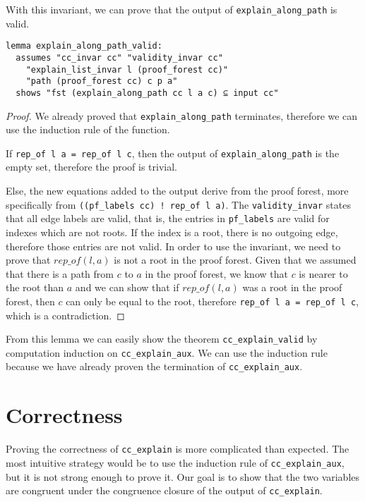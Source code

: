 With this invariant, we can prove that the output of \lstinline{explain_along_path} is valid.

\begin{lstlisting}
lemma explain_along_path_valid:
  assumes "cc_invar cc" "validity_invar cc"
    "explain_list_invar l (proof_forest cc)"
    "path (proof_forest cc) c p a"
  shows "fst (explain_along_path cc l a c) ⊆ input cc"
\end{lstlisting}

\begin{proof}
We already proved that \lstinline{explain_along_path} terminates, therefore we can use the induction rule of the function.

If \lstinline{rep_of l a = rep_of l c}, then the output of \lstinline{explain_along_path} is the empty set, therefore the proof is trivial.

Else, the new equations added to the output derive from the proof forest, more specifically from \lstinline{((pf_labels cc) ! rep_of l a)}.
The \lstinline{validity_invar} states that all edge labels are valid, that is, the entries in \lstinline|pf_labels| are valid for indexes which are not roots. If the index is a root, there is no outgoing edge, therefore those entries are not valid.
In order to use the invariant, we need to prove that $rep\_of(l, a)$ is not a root in the proof forest.
Given that we assumed that there is a path from $c$ to $a$ in the proof forest, we know that $c$ is nearer to the root than $a$ and we can show that if $rep\_of(l,a)$ was a root in the proof forest, then $c$ can only be equal to the root, therefore \lstinline{rep_of l a = rep_of l c}, which is a contradiction.
\end{proof}

From this lemma we can easily show the theorem \lstinline{cc_explain_valid} by computation induction on \lstinline{cc_explain_aux}. We can use the induction rule because we have already proven the termination of \lstinline{cc_explain_aux}.

\section{Correctness}

Proving the correctness of \lstinline{cc_explain} is more complicated than expected. The most intuitive strategy would be to use the induction rule of \lstinline{cc_explain_aux}, but it is not strong enough to prove it. Our goal is to show that the two variables are congruent under the congruence closure of the output of \lstinline{cc_explain}.


